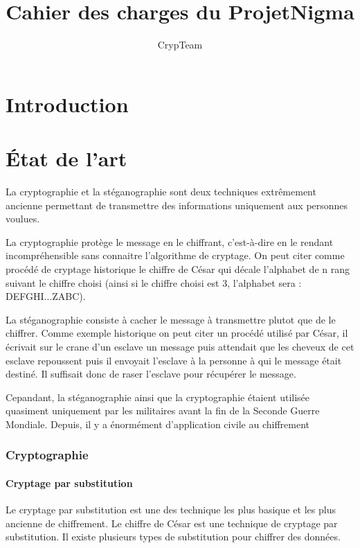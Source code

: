 \documentclass[a4paper,12pt]{article}
\title{Cahier des charges du ProjetNigma}
\author{CrypTeam}
\date{}
\begin{document}
	\maketitle{}
  	\tableofcontents
	\newpage				
	\part{Introduction}
	\newpage
	\part{\'{E}tat de l'art}
		La cryptographie et la stéganographie sont deux techniques extrêmement ancienne permettant de transmettre des informations uniquement aux personnes voulues.

 La cryptographie protège le message en le chiffrant, c'est-à-dire en le rendant incompréhensible sans connaitre l'algorithme de cryptage. On peut citer comme procédé de cryptage historique le chiffre de César qui décale l'alphabet de n rang suivant le chiffre choisi (ainsi si le chiffre choisi est 3, l'alphabet sera : DEFGHI...ZABC).

	La stéganographie consiste à cacher le message à transmettre plutot que de le chiffrer. Comme exemple historique on peut citer un procédé utilisé par César, il écrivait sur le crane d'un esclave un message puis attendait que les cheveux de cet esclave repoussent puis il envoyait l'esclave à la personne à qui le message était destiné. Il suffisait donc de raser l'esclave pour récupérer le message.

	Cepandant, la stéganographie ainsi que la cryptographie étaient utilisée quasiment uniquement par les militaires avant la fin de la Seconde Guerre Mondiale. Depuis, il y a énormément d'application civile au chiffrement 
		\section{Cryptographie}
			\subsection{Cryptage par substitution}
	Le cryptage par substitution  est une des technique les plus basique et les plus ancienne de chiffrement. Le chiffre de César est une technique de cryptage par substitution. Il existe plusieurs types de substitution pour chiffrer des données.
\end{document}
